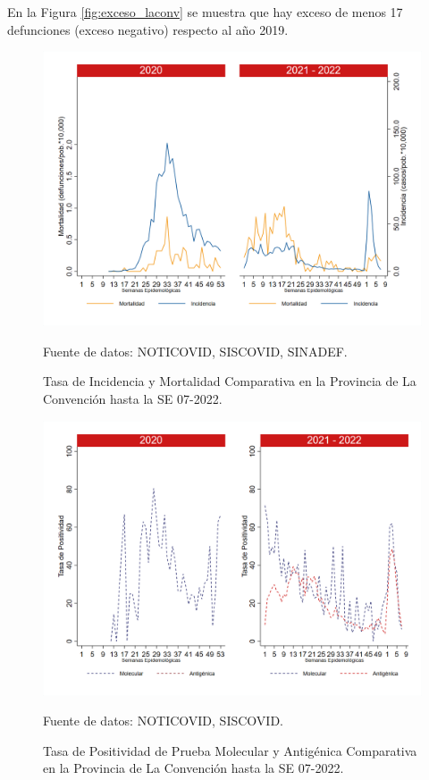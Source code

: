 \documentclass[12pt,a4paper,openany]{book}
\begin{document}
		
	En la Figura \ref{fig:exceso_laconv} se muestra que hay exceso de menos 17 defunciones (exceso negativo) respecto al año 2019.
		
		\begin{figure}[h]
			\caption{Tasa de Incidencia y Mortalidad Comparativa en la Provincia de La Convención hasta la SE 07-2022.}\label{fig:inc_mort_laconv}
			\begin{center}
				\includegraphics[width=0.7\linewidth]{../figuras/incidencia_mortalidad_20_21_9.png}
			\end{center}
			{\footnotesize {Fuente de datos: NOTICOVID, SISCOVID, SINADEF.}}
		\end{figure}
		
		\begin{figure}[h]
			\caption{Tasa de Positividad de Prueba Molecular y Antigénica Comparativa en la Provincia de La Convención hasta la SE 07-2022.}\label{fig:positividad_laconv}
			\begin{center}
				\includegraphics[width=0.7\linewidth]{../figuras/positividad_20_21_9.png}
			\end{center}
			{\footnotesize {Fuente de datos: NOTICOVID, SISCOVID.}}
		\end{figure}
		
\end{document}
